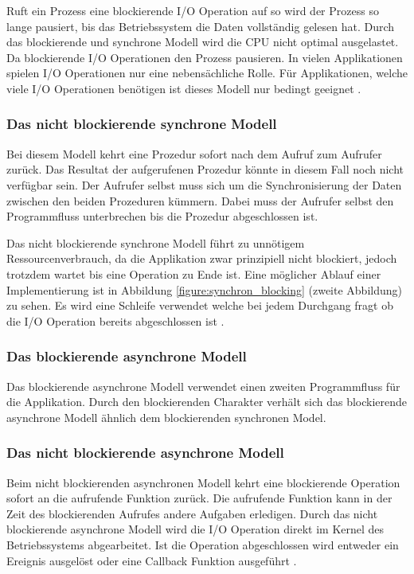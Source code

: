 Ruft ein Prozess eine blockierende I/O Operation auf so wird der Prozess so lange pausiert, bis das Betriebssystem die Daten vollständig gelesen hat. Durch das blockierende und synchrone Modell wird die CPU nicht optimal ausgelastet. Da blockierende I/O Operationen den Prozess pausieren. In vielen Applikationen spielen I/O Operationen nur eine nebensächliche Rolle. Für Applikationen, welche viele I/O Operationen benötigen ist dieses Modell nur bedingt geeignet \cite[p. 48]{Erb2012}.


\subsubsection{Das nicht blockierende synchrone Modell}

Bei diesem Modell kehrt eine Prozedur sofort nach dem Aufruf zum Aufrufer zurück. Das Resultat der aufgerufenen Prozedur könnte in diesem Fall noch nicht verfügbar sein. Der Aufrufer selbst muss sich um die Synchronisierung der Daten zwischen den beiden Prozeduren kümmern. Dabei muss der Aufrufer selbst den Programmfluss unterbrechen bis die Prozedur abgeschlossen ist. 

Das nicht blockierende synchrone Modell führt zu unnötigem Ressourcenverbrauch, da die Applikation zwar prinzipiell nicht blockiert, jedoch trotzdem wartet bis eine Operation zu Ende ist. Eine möglicher Ablauf einer Implementierung ist in Abbildung \ref{figure:synchron_blocking} (zweite Abbildung) zu sehen. Es wird eine Schleife verwendet welche bei jedem Durchgang fragt ob die I/O Operation bereits abgeschlossen ist \cite[p. 48]{Erb2012}.

\subsubsection{Das blockierende asynchrone Modell}

Das blockierende asynchrone Modell verwendet einen zweiten Programmfluss für die Applikation. Durch den blockierenden Charakter verhält sich das blockierende asynchrone Modell ähnlich dem blockierenden synchronen Model. 

\subsubsection{Das nicht blockierende asynchrone Modell}
Beim nicht blockierenden asynchronen Modell kehrt eine blockierende Operation sofort an die aufrufende Funktion zurück. Die aufrufende Funktion kann in der Zeit des blockierenden Aufrufes andere Aufgaben erledigen. Durch das nicht blockierende asynchrone Modell wird die I/O Operation direkt im Kernel des Betriebssystems abgearbeitet. Ist die Operation abgeschlossen wird entweder ein Ereignis ausgelöst oder eine Callback Funktion ausgeführt \cite[p. 48]{Erb2012}.

